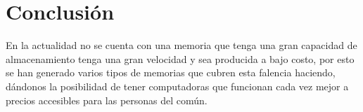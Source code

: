 \documentclass{article}
\begin{document}
\section{Conclusión} \label{Conclusión}

En la actualidad no se cuenta con una memoria que tenga una gran capacidad de almacenamiento tenga una gran velocidad y sea producida a bajo costo, por esto se han generado varios tipos de memorias que cubren esta falencia haciendo, dándonos la posibilidad de tener computadoras que funcionan cada vez mejor a precios accesibles para las personas del común. 



\end{document}
